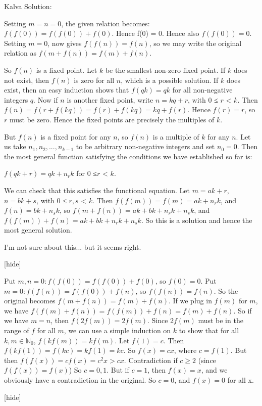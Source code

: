 \begin{solution}
	Kalva Solution:

Setting $m = n = 0$, the given relation becomes: $f(f(0)) = f(f(0)) + f(0)$. Hence f(0) = 0. Hence also $f(f(0)) = 0$. Setting $m = 0$, now gives $f(f(n)) = f(n)$, so we may write the original relation as $f(m + f(n)) = f(m) + f(n)$. 

So $f(n)$ is a fixed point. Let $k$ be the smallest non-zero fixed point. If $k$ does not exist, then $f(n)$ is zero for all $n$, which is a possible solution. If $k$ does exist, then an easy induction shows that $f(qk) = qk$ for all non-negative integers $q$. Now if $n$ is another fixed point, write $n = kq + r$, with $0$ ≤ $r$ < $k$. 
Then $f(n) = f(r + f(kq)) = f(r) + f(kq) = kq + f(r)$. Hence $f(r) = r$, so $r$ must be zero. Hence the fixed points are precisely the multiples of $k$. 

But $f(n)$ is a fixed point for any $n$, so $f(n)$ is a multiple of $k$ for any $n$. 
Let us take $n_1, n_2, ... , n_{k-1}$ to be arbitrary non-negative integers and set $n_0 = 0$. 
Then the most general function satisfying the conditions we have established so far is: 

      $f(qk + r) = qk + n_rk$ for $0$ ≤$r$ < $k$. 

We can check that this satisfies the functional equation. 
Let $m = ak + r$, $n = bk + s$, with $0$ ≤ $r, s$ < $k$. 
Then $f(f(m)) = f(m) = ak + n_rk$, and $f(n) = bk + n_sk$, 
so $f(m + f(n)) = ak + bk + n_rk + n_sk$, and $f(f(m)) + f(n) = ak + bk + n_rk + n_sk$. 
So this is a solution and hence the most general solution.
\end{solution}



\begin{solution}
	I'm not sure about this... but it seems right.

[hide]

Put $m,n=0: f(f(0)) = f(f(0)) + f(0)$, so $f(0) = 0$.
Put $m=0: f(f(n)) = f(f(0)) + f(n)$, so $f(f(n)) = f(n)$.
So the original becomes $f(m+f(n)) = f(m) + f(n)$.
If we plug in $f(m)$ for $m$, we have $f(f(m)+f(n)) = f(f(m)) + f(n) = f(m) + f(n)$.
So if we have $m=n$, then $f(2f(m)) = 2f(m)$.
Since $2f(m)$ must be in the range of $f$ for all $m$, we can use a simple induction on $k$ to show that for all $k,m \in \mathbb{N}_0$, $f(kf(m)) = kf(m)$.
Let $f(1)=c$. Then $f(kf(1)) = f(kc) = kf(1) = kc$.
So $f(x)=cx$, where $c=f(1)$.
But then $f(f(x)) = cf(x) = c^2x > cx$. Contradiction if $c \ge 2$ (since $f(f(x)) = f(x)$)
So $c=0,1$.
But if $c=1$, then $f(x)=x$, and we obviously have a contradiction in the original. So $c=0$, and $f(x)=0$ for all x.

[\/hide]
\end{solution}




